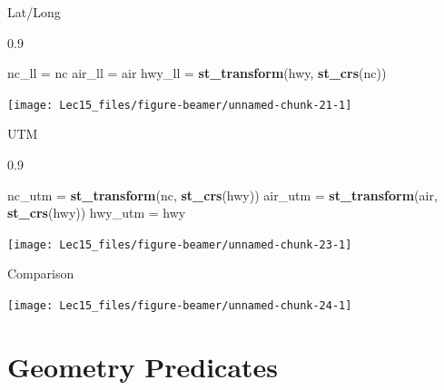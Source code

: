 \documentclass[11pt,ignorenonframetext,]{beamer}
\newenvironment{Shaded}{}{}
\newcommand{\KeywordTok}[1]{\textcolor[rgb]{0.00,0.44,0.13}{\textbf{#1}}}
\newcommand{\NormalTok}[1]{#1}
\newcommand{\StringTok}[1]{\textcolor[rgb]{0.25,0.44,0.63}{#1}}
\let\oldShaded\Shaded
\let\endoldShaded\endShaded
\renewenvironment{Shaded}{\footnotesize\begin{spacing}{0.9}\oldShaded}{\endoldShaded\end{spacing}}
\begin{document}
\begin{frame}[fragile]{Lat/Long}
\protect\hypertarget{latlong}{}

\begin{Shaded}
\begin{Highlighting}[]
\NormalTok{nc_ll =}\StringTok{ }\NormalTok{nc}
\NormalTok{air_ll =}\StringTok{ }\NormalTok{air}
\NormalTok{hwy_ll =}\StringTok{ }\KeywordTok{st_transform}\NormalTok{(hwy, }\KeywordTok{st_crs}\NormalTok{(nc))}
\end{Highlighting}
\end{Shaded}

\begin{center}\texttt{[image: Lec15\_files/figure-beamer/unnamed-chunk-21-1]} \end{center}

\end{frame}

\begin{frame}[fragile]{UTM}
\protect\hypertarget{utm}{}

\begin{Shaded}
\begin{Highlighting}[]
\NormalTok{nc_utm =}\StringTok{ }\KeywordTok{st_transform}\NormalTok{(nc, }\KeywordTok{st_crs}\NormalTok{(hwy))}
\NormalTok{air_utm =}\StringTok{ }\KeywordTok{st_transform}\NormalTok{(air, }\KeywordTok{st_crs}\NormalTok{(hwy))}
\NormalTok{hwy_utm =}\StringTok{ }\NormalTok{hwy}
\end{Highlighting}
\end{Shaded}

\begin{center}\texttt{[image: Lec15\_files/figure-beamer/unnamed-chunk-23-1]} \end{center}

\end{frame}

\begin{frame}{Comparison}
\protect\hypertarget{comparison}{}

\begin{center}\texttt{[image: Lec15\_files/figure-beamer/unnamed-chunk-24-1]} \end{center}

\end{frame}

\hypertarget{geometry-predicates}{%
\section{Geometry Predicates}\label{geometry-predicates}}
\end{document}
